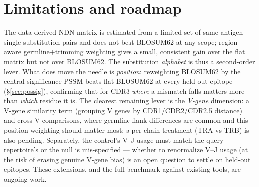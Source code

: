 \documentclass[11pt]{article}
\theoremstyle{oldplain}
\theoremstyle{oldrem}
\begin{document}
\section{Limitations and roadmap}
The data-derived NDN matrix is estimated from a limited set of same-antigen single-substitution pairs
and does not beat BLOSUM62 at any scope; region-aware germline$+$trimming weighting gives a small,
consistent gain over the flat matrix but not over BLOSUM62. The substitution \emph{alphabet} is thus a
second-order lever. What does move the needle is \emph{position}: reweighting BLOSUM62 by the
central-significance PSSM beats flat BLOSUM62 at every held-out epitope (\S\ref{sec:possig}), confirming
that for CDR3 \emph{where} a mismatch falls matters more than \emph{which} residue it is. The clearest
remaining lever is the \emph{V-gene} dimension: a V-gene similarity term (grouping V genes by
CDR1/CDR2/CDR2.5 distance) and cross-V comparisons, where germline-flank differences are common and this
position weighting should matter most; a per-chain treatment (TRA vs TRB) is also pending. Separately, the
control's V--J usage must match the query repertoire's or the null is mis-specified --- whether to
renormalize V--J usage (at the risk of erasing genuine V-gene bias) is an open question to settle on
held-out epitopes. These extensions, and the full benchmark against existing tools, are ongoing work.



\end{document}
